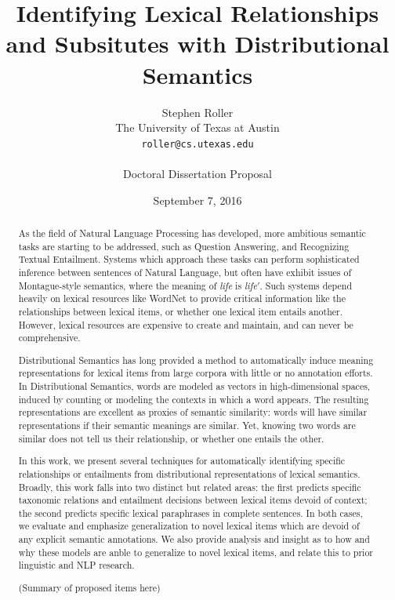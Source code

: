 \documentclass[letterpaper]{article}
\title{Identifying Lexical Relationships and Subsitutes with Distributional Semantics}
\author{Stephen Roller\\
The University of Texas at Austin\\
{\tt roller@cs.utexas.edu}\\
\\
Doctoral Dissertation Proposal}
\date{September 7, 2016}
\begin{document}
\maketitle

\begin{abstract}
  As the field of Natural Language Processing has developed, more ambitious
  semantic tasks are starting to be addressed, such as Question Answering, and
  Recognizing Textual Entailment. Systems which approach these tasks can
  perform sophisticated inference between sentences of Natural Language, but
  often have exhibit issues of Montague-style semantics, where the meaning of
  {\em life} is {\em life$'$}. Such systems depend heavily on lexical resources
  like WordNet to provide critical information like the relationships between
  lexical items, or whether one lexical item entails another. However, lexical
  resources are expensive to create and maintain, and can never be
  comprehensive.

  Distributional Semantics has long provided a method to automatically induce
  meaning representations for lexical items from large corpora with little or
  no annotation efforts. In Distributional Semantics, words are modeled as
  vectors in high-dimensional spaces, induced by counting or modeling the
  contexts in which a word appears. The resulting representations are excellent
  as proxies of semantic similarity: words will have similar representations if
  their semantic meanings are similar. Yet, knowing two words are similar does
  not tell us their relationship, or whether one entails the other.

  In this work, we present several techniques for automatically identifying
  specific relationships or entailments from distributional representations of
  lexical semantics. Broadly, this work falls into two distinct but related
  areas: the first predicts specific taxonomic relations and entailment
  decisions between lexical items devoid of context;
  the second predicts specific lexical paraphrases in complete sentences. In
  both cases, we evaluate and emphasize generalization to novel lexical items
  which are devoid of any explicit semantic annotations.  We also provide
  analysis and insight as to how and why these models are anble to generalize
  to novel lexical items, and relate this to prior linguistic and NLP research.

  (Summary of proposed items here)
\end{abstract}
\end{document}
